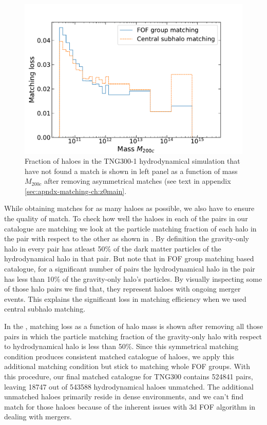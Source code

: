 \begin{figure}
    \includegraphics[width=\linewidth]{plots/hal_match_efficiency_mass_rev.pdf}
    \caption{Fraction of haloes in the TNG300-1 hydrodynamical simulation that have not found a match is shown in left panel as a function of mass $M_{200c}$ after removing asymmetrical matches (see text in appendix \ref{sec:apndx-matching-ch:z0main}.}
    \label{fig:efficiency-mass-rev-ch:z0main}
\end{figure}

While obtaining matches for as many haloes as possible, we also have to ensure the quality of match. To check how well the haloes in each of the pairs in our catalogue are matching we look at the particle matching fraction of each halo in the pair with respect to the other as shown in . By definition the gravity-only halo in every pair has atleast 50\% of the dark matter particles of the hydrodynamical halo in that pair. But note that in FOF group matching based catalogue, for a significant number of pairs the hydrodynamical halo in the pair has less than 10\% of the gravity-only halo's particles. By visually inspecting some of those halo pairs we find that, they represent haloes with ongoing merger events. This explains the significant loss in matching efficiency when we used central subhalo matching. 

In the , matching loss as a function of halo mass is shown after removing all those pairs in which the particle matching fraction of the gravity-only halo with respect to hydrodynamical halo is less than 50\%. Since this symmetrical matching condition produces consistent matched catalogue of haloes, we apply this additional matching condition  but stick to matching whole FOF groups. With this procedure, our final matched catalogue for TNG300 contains 524841 pairs, leaving 18747 out of 543588 hydrodynamical haloes unmatched. The additional unmatched haloes primarily reside in dense environments, and we can't find match for those haloes because of the inherent issues with 3d FOF algorithm in dealing with mergers. 


